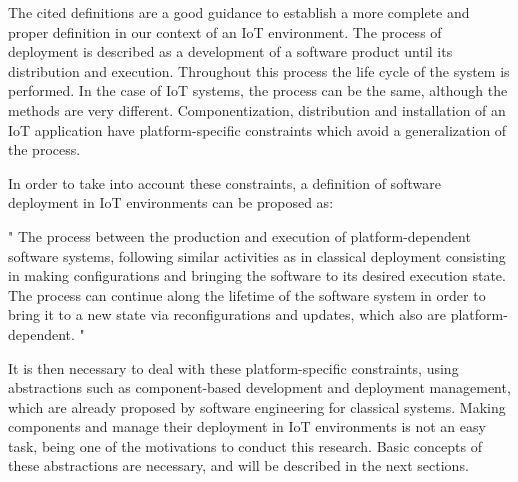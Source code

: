 The cited definitions are a good guidance to establish a more complete and proper definition in our context of an IoT environment.
The process of deployment is described as a development of a software product until its distribution and execution.
Throughout this process the life cycle of the system is performed.
In the case of IoT systems, the process can be the same, although the methods are very different.
Componentization, distribution and installation of an IoT application have platform-specific constraints which avoid a generalization of the process.

In order to take into account these constraints, a definition of software deployment in IoT environments can be proposed as:
\begin{citeverbatim}
	" The process between the production and execution of platform-dependent software systems, following similar activities as in classical deployment consisting in making configurations and bringing the software to its desired execution state. The process can continue along the lifetime of the software system in order to bring it to a new state via reconfigurations and updates, which also are platform-dependent. "
\end{citeverbatim}
It is then necessary to deal with these platform-specific constraints, using abstractions such as component-based development and deployment management, which are already proposed by software engineering for classical systems.
Making components and manage their deployment in IoT environments is not an easy task, being one of the motivations to conduct this research.
Basic concepts of these abstractions are necessary, and will be described in the next sections.

